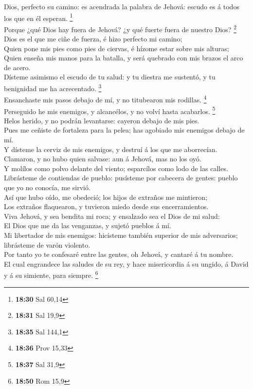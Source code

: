  Dios, perfecto su camino: es acendrada la palabra de
Jehová: escudo es á todos los que en él esperan. \footnote{\textbf{18:30}
  Sal 60,14}\\
 Porque ¿qué Dios hay fuera de Jehová? ¿y qué fuerte
fuera de nuestro Dios? \footnote{\textbf{18:31} Sal 19,9}\\
 Dios es el que me ciñe de fuerza, é hizo perfecto mi
camino;\\
 Quien pone mis pies como pies de ciervas, é hízome estar
sobre mis alturas;\\
 Quien enseña mis manos para la batalla, y será quebrado
con mis brazos el arco de acero.\\
 Dísteme asimismo el escudo de tu salud: y tu diestra me
sustentó, y tu benignidad me ha acrecentado. \footnote{\textbf{18:35}
  Sal 144,1}\\
 Ensanchaste mis pasos debajo de mí, y no titubearon mis
rodillas. \footnote{\textbf{18:36} Prov 15,33}\\
 Perseguido he mis enemigos, y alcancélos, y no volví
hasta acabarlos. \footnote{\textbf{18:37} Sal 31,9}\\
 Helos herido, y no podrán levantarse: cayeron debajo de
mis pies.\\
 Pues me ceñiste de fortaleza para la pelea; has agobiado
mis enemigos debajo de mí.\\
 Y dísteme la cerviz de mis enemigos, y destruí á los que
me aborrecían.\\
 Clamaron, y no hubo quien salvase: aun á Jehová, mas no
los oyó.\\
 Y molílos como polvo delante del viento; esparcílos como
lodo de las calles.\\
 Librásteme de contiendas de pueblo: pusísteme por
cabecera de gentes: pueblo que yo no conocía, me sirvió.\\
 Así que hubo oído, me obedeció; los hijos de extraños me
mintieron;\\
 Los extraños flaquearon, y tuvieron miedo desde sus
encerramientos.\\
 Viva Jehová, y sea bendita mi roca; y ensalzado sea el
Dios de mi salud:\\
 El Dios que me da las venganzas, y sujetó pueblos á
mí.\\
 Mi libertador de mis enemigos: hicísteme también
superior de mis adversarios; librásteme de varón violento.\\
 Por tanto yo te confesaré entre las gentes, oh Jehová, y
cantaré á tu nombre.\\
 El cual engrandece las saludes de su rey, y hace
misericordia á su ungido, á David y á su simiente, para siempre.
\footnote{\textbf{18:50} Rom 15,9}

